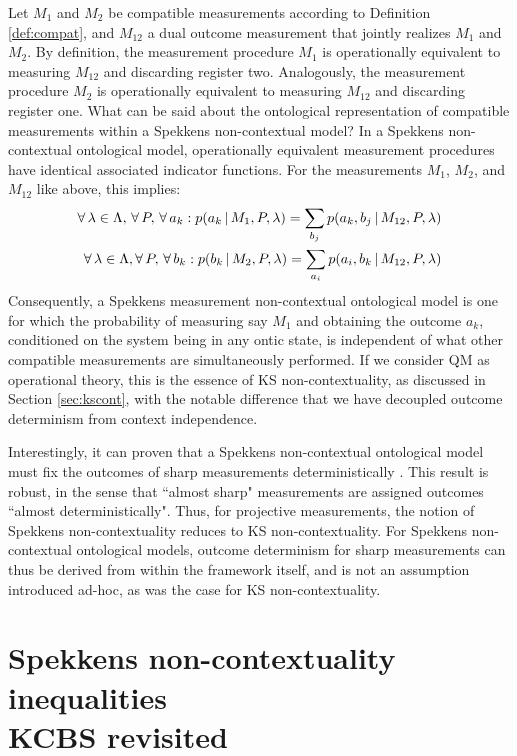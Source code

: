 Let $M_{1}$ and $M_{2}$ be compatible measurements according to Definition \ref{def:compat}, and $M_{12}$ a dual outcome measurement that jointly realizes $M_1$ and $M_2$. By definition, the measurement procedure $M_{1}$ is operationally equivalent to measuring $M_{12}$ and discarding register two. Analogously, the measurement procedure $M_{2}$ is operationally equivalent to measuring $M_{12}$ and discarding register one. What can be said about the ontological representation of compatible measurements within a Spekkens non-contextual model? In a Spekkens non-contextual ontological model, operationally equivalent measurement procedures have identical associated indicator functions. For the measurements $M_{1}$, $M_{2}$, and $M_{12}$ like above, this implies:
\begin{align*}
\forall\thinspace\lambda\in\Lambda,\thinspace\forall \thinspace P,\thinspace\forall\thinspace a_{k}:p(a_{k}\thinspace\vert\thinspace M_{1},P,\lambda)=\sum_{b_{j}}p(a_{k},b_{j}\thinspace\vert\thinspace M_{12},P,\lambda)\\
\forall\thinspace\lambda\in\Lambda,\forall\thinspace P,\thinspace\forall\thinspace b_{k}:p(b_{k}\thinspace\vert\thinspace M_{2},P,\lambda)=\sum_{a_{i}}p(a_{i},b_{k}\thinspace\vert\thinspace M_{12},P,\lambda)
\end{align*}
Consequently, a Spekkens measurement non-contextual ontological model is one for which the probability of measuring say $M_{1}$ and obtaining the outcome $a_{k}$, conditioned on the system being in any ontic state, is independent of what other compatible measurements are simultaneously performed. If we consider QM as operational theory, this is the essence of KS non-contextuality, as discussed in Section \ref{sec:kscont}, with the notable difference that we have decoupled outcome determinism from context independence.

Interestingly, it can proven that a Spekkens non-contextual ontological model must fix the outcomes of sharp measurements deterministically \cite{Spekkens2014}. This result is robust, in the sense that ``almost sharp" measurements are assigned outcomes ``almost deterministically". Thus, for projective measurements, the notion of Spekkens non-contextuality reduces to KS non-contextuality. For Spekkens non-contextual ontological models, outcome determinism for sharp measurements can thus be derived from within the framework itself, and is not an assumption introduced ad-hoc, as was the case for KS non-contextuality.

\section[Spekkens non-contextuality inequalities \\ KCBS revisited]{Spekkens non-contextuality inequalities \\ \large{KCBS revisited}}
\label{sec:spekkensineq}

